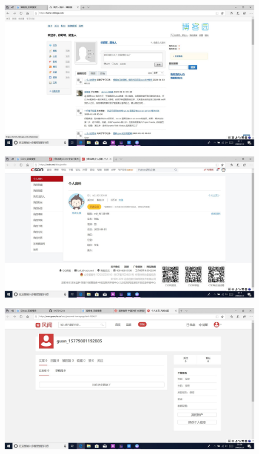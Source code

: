 \documentclass{article}
\begin{document}
  \begin{figure}[H]
	\centering
	\includegraphics[scale=0.5]{boke}
	\caption{}
	\label{fig:boke}
\end{figure}
  \begin{figure}[H]
	\centering
	\includegraphics[scale=0.5]{csdn}
	\caption{}
	\label{fig:csdn}
\end{figure}
  \begin{figure}[H]
	\centering
	\includegraphics[scale=0.5]{guanchazhe}
	\caption{}
	\label{fig:guanchazhe}
\end{figure}
\end{document}
